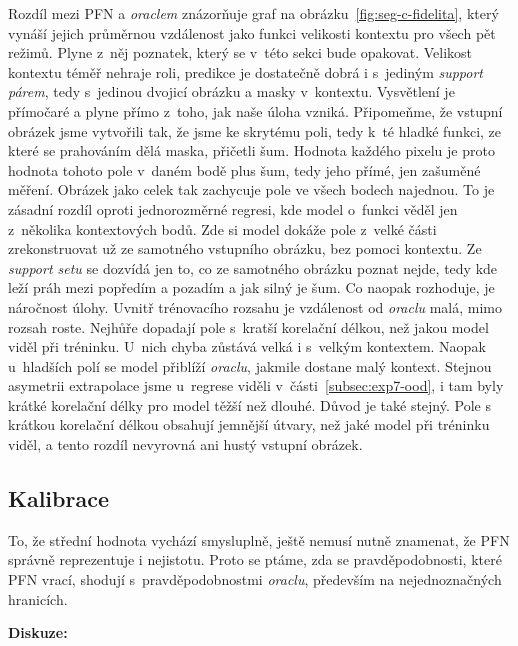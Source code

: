 Rozdíl mezi PFN a \emph{oraclem} znázorňuje graf na obrázku~\ref{fig:seg-c-fidelita}, který vynáší jejich průměrnou vzdálenost jako funkci velikosti kontextu pro všech pět režimů.
Plyne z~něj poznatek, který se v~této sekci bude opakovat.
Velikost kontextu téměř nehraje roli, predikce je dostatečně dobrá i s~jediným \emph{support párem}, tedy s~jedinou dvojicí obrázku a masky v~kontextu.
Vysvětlení je přímočaré a plyne přímo z~toho, jak naše úloha vzniká.
Připomeňme, že vstupní obrázek jsme vytvořili tak, že jsme ke skrytému poli, tedy k~té hladké funkci, ze které se prahováním dělá maska, přičetli šum.
Hodnota každého pixelu je proto hodnota tohoto pole v~daném bodě plus šum, tedy jeho přímé, jen zašuměné měření.
Obrázek jako celek tak zachycuje pole ve všech bodech najednou.
To je zásadní rozdíl oproti jednorozměrné regresi, kde model o~funkci věděl jen z~několika kontextových bodů.
Zde si model dokáže pole z~velké části zrekonstruovat už ze samotného vstupního obrázku, bez pomoci kontextu.
Ze \emph{support setu} se dozvídá jen to, co ze samotného obrázku poznat nejde, tedy kde leží práh mezi popředím a pozadím a jak silný je šum.
Co naopak rozhoduje, je náročnost úlohy.
Uvnitř trénovacího rozsahu je vzdálenost od \emph{oraclu} malá, mimo rozsah roste.
Nejhůře dopadají pole s~kratší korelační délkou, než jakou model viděl při tréninku.
U~nich chyba zůstává velká i s~velkým kontextem.
Naopak u~hladších polí se model přiblíží \emph{oraclu}, jakmile dostane malý kontext.
Stejnou asymetrii extrapolace jsme u~regrese viděli v~části~\ref{subsec:exp7-ood}, i tam byly krátké korelační délky pro model těžší než dlouhé.
Důvod je také stejný.
Pole s krátkou korelační délkou obsahují jemnější útvary, než jaké model při tréninku viděl, a tento rozdíl nevyrovná ani hustý vstupní obrázek.
\par

\subsection{Kalibrace}
\label{subsec:seg-c-kalibrace}

To, že střední hodnota vychází smysluplně, ještě nemusí nutně znamenat, že PFN správně reprezentuje i nejistotu.
Proto se ptáme, zda se pravděpodobnosti, které PFN vrací, shodují s~pravděpodobnostmi \emph{oraclu}, především na nejednoznačných hranicích.
\par

\textbf{Diskuze:}

